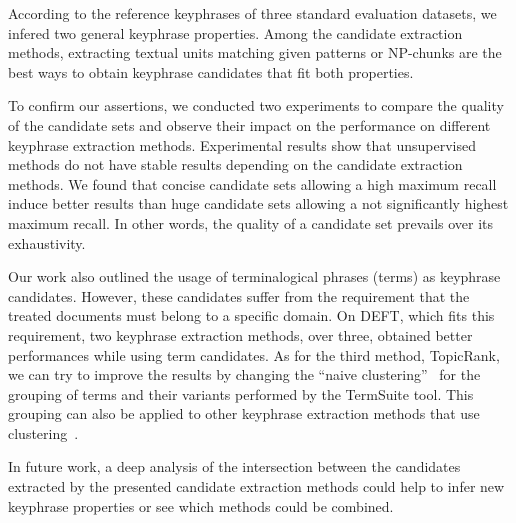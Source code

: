   According to the reference keyphrases of three standard evaluation datasets,
  we infered two general keyphrase properties. Among the candidate extraction
  methods, extracting textual units matching given patterns or NP-chunks are the
  best ways to obtain keyphrase candidates that fit both properties.

  To confirm our assertions, we conducted two experiments to compare the quality
  of the candidate sets and observe their impact on
  the performance on different keyphrase extraction methods. Experimental
  results show that unsupervised methods do not have stable results depending on
  the candidate extraction methods. We found that concise candidate sets
  allowing a high maximum recall induce better results than huge candidate sets
  allowing a not significantly highest maximum recall. In other words, the
  quality of a candidate set prevails over its exhaustivity.

  Our work also outlined the usage of terminalogical phrases (terms) as
  keyphrase candidates. However, these candidates suffer from the requirement
  that the treated documents must belong to a specific domain. On DEFT, which
  fits this requirement, two keyphrase extraction methods, over three, obtained
  better performances while using term candidates. As for the third method,
  TopicRank, we can try to improve the results by changing the ``naive
  clustering''~\cite{bougouin2013topicrank} for the grouping of terms and their
  variants performed by the TermSuite tool. This grouping can also be applied to
  other keyphrase extraction methods that use
  clustering~\cite{matsuo2004wordcooccurrence}.

  In future work, a deep analysis of the intersection between the candidates
  extracted by the presented candidate extraction methods could help to infer
  new keyphrase properties or see which methods could be combined.


